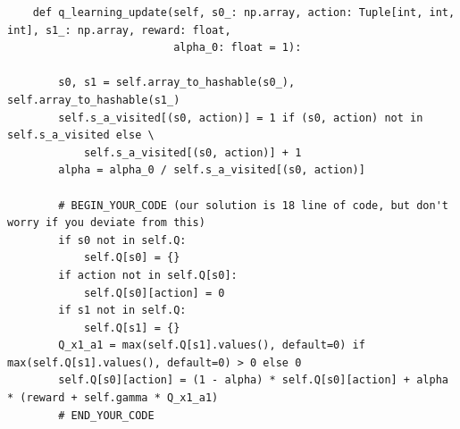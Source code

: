 \documentclass{article}
\begin{document}
\begin{lstlisting}
    def q_learning_update(self, s0_: np.array, action: Tuple[int, int, int], s1_: np.array, reward: float,
                          alpha_0: float = 1):

        s0, s1 = self.array_to_hashable(s0_), self.array_to_hashable(s1_)
        self.s_a_visited[(s0, action)] = 1 if (s0, action) not in self.s_a_visited else \
            self.s_a_visited[(s0, action)] + 1
        alpha = alpha_0 / self.s_a_visited[(s0, action)]

        # BEGIN_YOUR_CODE (our solution is 18 line of code, but don't worry if you deviate from this)
        if s0 not in self.Q:
            self.Q[s0] = {}
        if action not in self.Q[s0]:
            self.Q[s0][action] = 0
        if s1 not in self.Q:
            self.Q[s1] = {}
        Q_x1_a1 = max(self.Q[s1].values(), default=0) if max(self.Q[s1].values(), default=0) > 0 else 0  
        self.Q[s0][action] = (1 - alpha) * self.Q[s0][action] + alpha * (reward + self.gamma * Q_x1_a1)
        # END_YOUR_CODE


\end{lstlisting}
\end{document}
